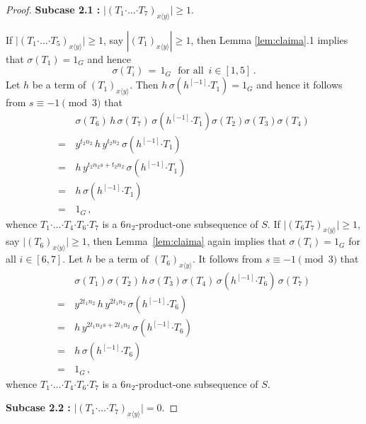 \documentclass[leqno,a4paper]{amsart}
\def\bd{{\boldsymbol{\cdot}}}
\theoremstyle{plain}
\theoremstyle{definition}
\numberwithin{equation}{section}
\begin{document}
\begin{proof}
        \smallskip
        \noindent
        {\bf Subcase 2.1 :} $\big| (T_1\bd \ldots \bd T_7)_{x\langle y\rangle} \big| \ge 1$.
        \smallskip


        	
		If $ \big| (T_1 \bd \ldots \bd T_5)_{x \langle y \rangle} \big| \ge 1$, say $ |(T_1)_{x\langle y\rangle}|\ge 1$, then Lemma \ref{lem:claima}.1 implies  that $\sigma(T_1) = 1_G$ and hence
		\[
		  \sigma(T_i) \, = \, 1_G \,\, \mbox{ for all } \, i\in [1,5] \,.
		\]
		Let $h$ be  a term of $(T_1)_{x\langle y\rangle}$. Then $h\,\sigma (h^{[-1]} \bd T_1)=1_G$ and hence it follows from $s\equiv -1\pmod 3$ that
		\begin{align*}
          & \, \sigma(T_6)\, h\, \sigma(T_7) \,\sigma (h^{[-1]} \bd T_1) \sigma(T_2) \sigma(T_3) \sigma(T_4) \\
          = & \, y^{t_2n_2}\,h\,y^{t_2n_2}\,\sigma (h^{[-1]} \bd T_1)\\
          = & \, h\,y^{t_2n_2s+t_2n_2}\,\sigma (h^{[-1]} \bd T_1)\\
          = & \, h\,\sigma (h^{[-1]} \bd T_1)\\
          = & \, 1_G \,,
        \end{align*}
		whence $T_1\bd \ldots\bd T_4 \bd T_6 \bd T_7$ is a $6n_2$-product-one subsequence of $S$.
        If $\big| (T_6 T_7)_{x\langle y\rangle} \big| \ge 1$, say $\big| (T_6)_{x\langle y\rangle} \big| \ge 1$, then  Lemma~\ref{lem:claima} again implies that $\sigma(T_i) = 1_G$ for all $i\in [6,7]$. Let $h$ be a term of $(T_6)_{x\langle y\rangle}$.
It follows from $s\equiv -1\pmod 3$ that
\begin{align*}
	& \, \sigma(T_1) \sigma (T_2)\, h\, \sigma(T_3) \sigma (T_4)\, \sigma (h^{[-1]} \bd T_6)\, \sigma (T_7) \\
	= & \, y^{2t_1n_2}\,h\,y^{2t_1n_2}\,\sigma (h^{[-1]} \bd T_6)\\
	= & \, h\,y^{2t_1n_2s+2t_1n_2}\,\sigma (h^{[-1]} \bd T_6)\\
	= & \, h\,\sigma (h^{[-1]} \bd T_6)\\
	= & \, 1_G \,,
\end{align*}
whence $T_1\bd \ldots\bd T_4 \bd T_6 \bd T_7$ is a $6n_2$-product-one subsequence of $S$.

        \smallskip
        \noindent
        {\bf Subcase 2.2 :} $\big| (T_1\bd \ldots \bd T_7)_{x\langle y\rangle} \big| = 0$.
        \smallskip




\end{proof}
\end{document}
